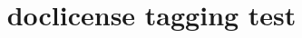 \documentclass[english]{article}
\title{doclicense tagging test}
\begin{document}
\doclicenseThis%
\end{document}
